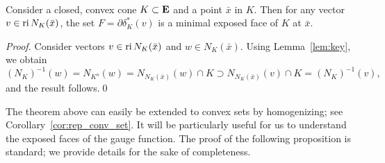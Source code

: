 \documentclass[smallextended,numbook]{svjour3}
\begin{document}
\begin{appendices}
\begin{thm}\label{thm:exp} {\hfill \\}
Consider a closed, convex cone $K\subset{{\bf E}}$ and a point $\bar{x}$ in $K$. Then for any vector $v\in {\mbox{\rm ri}\,} N_K(\bar{x})$, the set $F=\partial \delta^{*}_K(v)$
is a minimal exposed face of $K$ at $\bar{x}$.
\end{thm}
\begin{proof}
Consider vectors $v\in{\mbox{\rm ri}\,} N_{K}(\bar{x})$ and $w\in N_{K}(\bar{x})$. Using Lemma~\ref{lem:key}, we obtain
$$(N_K)^{-1}(w)=N_{K^{o}}(w)=N_{N_{K}(\bar{x})}(w)\cap K\supset N_{N_{K}(\bar{x})}(v)\cap K=(N_K)^{-1}(v),$$
and the result follows.\qed
\end{proof}

The theorem above can easily be extended to convex sets by homogenizing; see Corollary~\ref{cor:rep_conv_set}. 
It will be particularly useful for us to understand the exposed faces of the gauge function. The proof of the following proposition is standard; we provide details for the sake of completeness.


\end{appendices}
\end{document}
